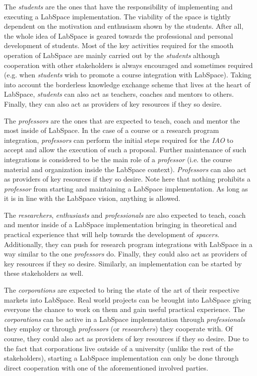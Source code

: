 \documentclass[a4paper, 11pt]{article}
\begin{document}
The \textit{students} are the ones that have the responsibility of implementing and executing a LabSpace implementation. The viability of the space is tightly dependent on the motivation and enthusiasm shown by the students. After all, the whole idea of LabSpace is geared towards the professional and personal development of students. Most of the key activities required for the smooth operation of LabSpace are mainly carried out by the \textit{students} although cooperation with other stakeholders is always encouraged and sometimes required (e.g. when \textit{students} wish to promote a course integration with LabSpace). Taking into account the borderless knowledge exchange scheme that lives at the heart of LabSpace, \textit{students} can also act as teachers, coaches and mentors to others. Finally, they can also act as providers of key resources if they so desire.

The \textit{professors} are the ones that are expected to teach, coach and mentor the most inside of LabSpace. In the case of a course or a research program integration, \textit{professors} can perform the initial steps required for the \textit{IAO} to accept and allow the execution of such a proposal. Further maintenance of such integrations is considered to be the main role of a \textit{professor} (i.e. the course material and organization inside the LabSpace context). \textit{Professors} can also act as providers of key resources if they so desire. Note here that nothing prohibits a \textit{professor} from starting and maintaining a LabSpace implementation. As long as it is in line with the LabSpace vision, anything is allowed.

The \textit{researchers}, \textit{enthusiasts} and \textit{professionals} are also expected to teach, coach and mentor inside of a LabSpace implementation bringing in theoretical and practical experience that will help towards the development of \textit{spacers}. Additionally, they can push for research program integrations with LabSpace in a way similar to the one \textit{professors} do. Finally, they could also act as providers of key resources if they so desire. Similarly, an implementation can be started by these stakeholders as well.

The \textit{corporations} are expected to bring the state of the art of their respective markets into LabSpace. Real world projects can be brought into LabSpace giving everyone the chance to work on them and gain useful practical experience. The \textit{corporations} can be active in a LabSpace implementation through \textit{professionals} they employ or through \textit{professors} (or \textit{researchers}) they cooperate with. Of course, they could also act as providers of key resources if they so desire. Due to the fact that corporations live outside of a university (unlike the rest of the stakeholders), starting a LabSpace implementation can only be done through direct cooperation with one of the aforementioned involved parties.
\end{document}
